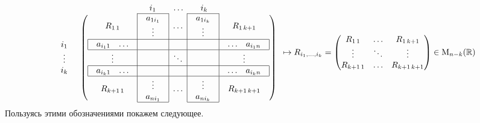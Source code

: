 \[
\begin{array}{cc}
{}&{
\begin{array}{ccccc}
{}&{i_1\phantom{aa}}&{\ldots}&{\phantom{aa}i_k}&{}\\
\end{array}
}\\
{
\begin{array}{c}
{}\\{i_1}\\{\vdots}\\{i_k}\\{}
\end{array}
}&{
\left(
\begin{array}{c|c|c|c|c}
\cline{2-2}
\cline{4-4}
{R_{1\,1}}&{
\begin{array}{c}
{a_{1i_1}}\\{\vdots}
\end{array}
}&{\ldots}&{
\begin{array}{c}
{a_{1i_k}}\\{\vdots}
\end{array}
}&{R_{1\,k+1}}\\
\hline
\multicolumn{1}{|c|}{
\begin{array}{cc}
{a_{i_11}}&{\ldots}\\
\end{array}
}&{}&{}&{}&\multicolumn{1}{c|}{
\begin{array}{cc}
{\ldots}&{a_{i_1n}}\\
\end{array}
}\\
\hline
{\vdots}&{}&{\ddots}&{}&{\vdots}\\
\hline
\multicolumn{1}{|c|}{
\begin{array}{cc}
{a_{i_k1}}&{\ldots}\\
\end{array}
}&{}&{}&{}&\multicolumn{1}{c|}{
\begin{array}{cc}
{\ldots}&{a_{i_kn}}\\
\end{array}
}\\
\hline
{R_{k+1\,1}}&{
\begin{array}{c}
{\vdots}\\{a_{ni_1}}
\end{array}
}&{\ldots}&{
\begin{array}{c}
{\vdots}\\{a_{ni_k}}
\end{array}
}&{R_{k+1\,k+1}}\\
\cline{2-2}
\cline{4-4}
\end{array}
\right)
}\\
\end{array}
\mapsto
R_{i_1,\ldots,i_k} = 
\begin{pmatrix}
{R_{1\,1}}&{\ldots}&{R_{1\,k+1}}\\
{\vdots}&{\ddots}&{\vdots}\\
{R_{k+1\,1}}&{\ldots}&{R_{k+1\,k+1}}\\
\end{pmatrix}
\in\Matrix{n-k}
\]
Пользуясь этими обозначениями покажем следующее.

